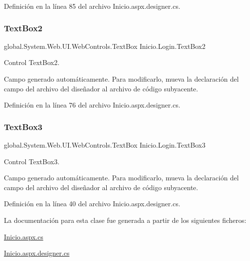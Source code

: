 Definición en la línea 85 del archivo Inicio.\+aspx.\+designer.\+cs.

\mbox{\label{classInicio_1_1Login_ac99495a6fbd78cbf118b7c058815e9f2}} 
\subsubsection{\texorpdfstring{TextBox2}{TextBox2}}
{\footnotesize\ttfamily global.\+System.\+Web.\+U\+I.\+Web\+Controls.\+Text\+Box Inicio.\+Login.\+Text\+Box2\hspace{0.3cm}{\ttfamily [protected]}}



Control Text\+Box2. 

Campo generado automáticamente. Para modificarlo, mueva la declaración del campo del archivo del diseñador al archivo de código subyacente. 

Definición en la línea 76 del archivo Inicio.\+aspx.\+designer.\+cs.

\mbox{\label{classInicio_1_1Login_af3c872110454773d5d53d83c27e6ccb6}} 
\subsubsection{\texorpdfstring{TextBox3}{TextBox3}}
{\footnotesize\ttfamily global.\+System.\+Web.\+U\+I.\+Web\+Controls.\+Text\+Box Inicio.\+Login.\+Text\+Box3\hspace{0.3cm}{\ttfamily [protected]}}



Control Text\+Box3. 

Campo generado automáticamente. Para modificarlo, mueva la declaración del campo del archivo del diseñador al archivo de código subyacente. 

Definición en la línea 40 del archivo Inicio.\+aspx.\+designer.\+cs.



La documentación para esta clase fue generada a partir de los siguientes ficheros\+:\begin{DoxyCompactItemize}
\item 
\mbox{\hyperlink{Inicio_8aspx_8cs}{Inicio.\+aspx.\+cs}}\item 
\mbox{\hyperlink{Inicio_8aspx_8designer_8cs}{Inicio.\+aspx.\+designer.\+cs}}\end{DoxyCompactItemize}
